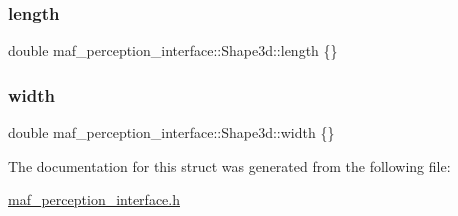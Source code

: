 \subsubsection{\texorpdfstring{length}{length}}
{\footnotesize\ttfamily double maf\+\_\+perception\+\_\+interface\+::\+Shape3d\+::length \{\}}

\mbox{\label{structmaf__perception__interface_1_1Shape3d_a2e9aa6c0086541afa74a50584543404d}} 
\subsubsection{\texorpdfstring{width}{width}}
{\footnotesize\ttfamily double maf\+\_\+perception\+\_\+interface\+::\+Shape3d\+::width \{\}}



The documentation for this struct was generated from the following file\+:\begin{DoxyCompactItemize}
\item 
\hyperlink{maf__perception__interface_8h}{maf\+\_\+perception\+\_\+interface.\+h}\end{DoxyCompactItemize}
